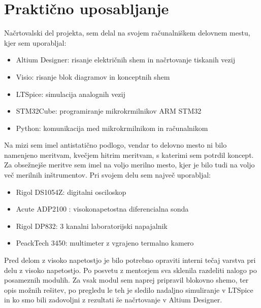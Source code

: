 \documentclass[a4paper,twoside,openright,12pt,slovene]{book}
\begin{document}
	\section{Praktično uposabljanje}
	Načrtovalski del projekta, sem delal na svojem računalniškem delovnem mestu, kjer sem uporabljal:
	\begin{itemize}
		\item Altium Designer: risanje električnih shem in načrtovanje tiskanih vezij
		\item Visio: risanje blok diagramov in konceptnih shem
		\item LTSpice: simulacija analognih vezij
		\item STM32Cube: programiranje mikrokrmilnikov ARM STM32
		\item Python: komunikacija med mikrokrmilnikom in računalnikom
	\end{itemize}
	Na mizi sem imel antistatično podlogo, vendar to delovno mesto ni bilo namenjeno meritvam, kvečjem hitrim meritvam, s katerimi sem potrdil koncept.
	Za obsežnejše meritve sem imel na voljo merilno mesto, kjer je bilo tudi na voljo več merilnih inštrumentov. Pri svojem delu sem največ uporabljal:
	\begin{itemize}
		\item Rigol DS1054Z: digitalni osciloskop
		\item Acute ADP2100 : visokonapetostna diferencialna sonda
		\item Rigol DP832: 3 kanalni laboratorijski napajalnik
		\item PeackTech 3450: multimeter z vgrajeno termalno kamero
	\end{itemize}
	Pred delom z visoko napetostjo je bilo potrebno opraviti interni tečaj varstva pri delu z visoko napetostjo. Po posvetu z mentorjem sva sklenila razdeliti nalogo po posameznih modulih. Za vsak modul sem naprej pripravil blokovno shemo, ter opis možnih rešitev, po pregledu le teh je sledilo nadaljno simuliranje v LTSpice in ko smo bili zadovoljni z rezultati še načrtovanje v Altium Designer.
	
\end{document}
